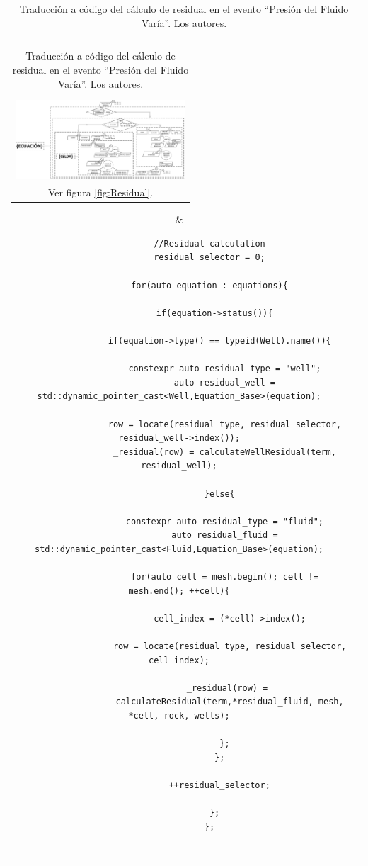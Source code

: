 \begin{table}[h]
	\centering
	\begin{tabular}{cc}
		\parbox[c]{4em}{
			\begin{tabular}[c]{@{}c@{}}\includegraphics[width=2.5in]{Fig/Residual.pdf}\\ Ver figura \ref{fig:Residual}.\end{tabular}
		}
		&
		\begin{tiny}
			\begin{lstlisting}
			//Residual calculation
			residual_selector = 0;
			
			for(auto equation : equations){
			
			  if(equation->status()){
				
				if(equation->type() == typeid(Well).name()){
					
				  constexpr auto residual_type = "well";
				  auto residual_well = std::dynamic_pointer_cast<Well,Equation_Base>(equation);
					
				  row = locate(residual_type, residual_selector, residual_well->index());
				  _residual(row) = calculateWellResidual(term, residual_well);
						
				}else{
						
				  constexpr auto residual_type = "fluid";
				  auto residual_fluid = std::dynamic_pointer_cast<Fluid,Equation_Base>(equation);
						
				  for(auto cell = mesh.begin(); cell != mesh.end(); ++cell){
						
				    cell_index = (*cell)->index();
							
					row = locate(residual_type, residual_selector, cell_index);
							
					_residual(row) = 
					calculateResidual(term,*residual_fluid, mesh, *cell, rock, wells);
						
				  };
				};
					
				++residual_selector;
				
			  };
			};
			
			\end{lstlisting}
		\end{tiny}
	\end{tabular}
	\label{tab:ResidualCode}
	\caption[Traducción a código del cálculo de residual en el evento ``Presión del Fluido Varía''.]{Traducción a código del cálculo de residual en el evento ``Presión del Fluido Varía''. Los autores.}
\end{table}

